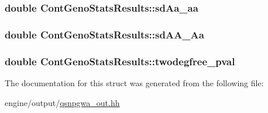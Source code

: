 \label{structContGenoStatsResults_a17738d1319ce925127a86b45d321b58b}
\hypertarget{structContGenoStatsResults_a334d91db43991eca160597eaefa1507f}{
\subsubsection[{sdAa\_\-aa}]{\setlength{\rightskip}{0pt plus 5cm}double {\bf ContGenoStatsResults::sdAa\_\-aa}}}
\label{structContGenoStatsResults_a334d91db43991eca160597eaefa1507f}
\hypertarget{structContGenoStatsResults_a8d8428b3e5e541bc9f3ba97fe585ad1c}{
\subsubsection[{sdAA\_\-Aa}]{\setlength{\rightskip}{0pt plus 5cm}double {\bf ContGenoStatsResults::sdAA\_\-Aa}}}
\label{structContGenoStatsResults_a8d8428b3e5e541bc9f3ba97fe585ad1c}
\hypertarget{structContGenoStatsResults_a46e49f7e50c6e79cb72a24541af776de}{
\subsubsection[{twodegfree\_\-pval}]{\setlength{\rightskip}{0pt plus 5cm}double {\bf ContGenoStatsResults::twodegfree\_\-pval}}}
\label{structContGenoStatsResults_a46e49f7e50c6e79cb72a24541af776de}


The documentation for this struct was generated from the following file:\begin{DoxyCompactItemize}
\item 
engine/output/\hyperlink{qsnpgwa__out_8hh}{qsnpgwa\_\-out.hh}\end{DoxyCompactItemize}
